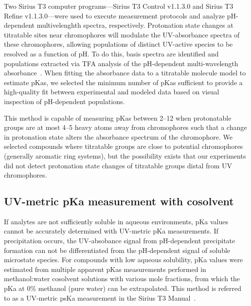 \documentclass[9pt,lineno]{elife}
\begin{document}
Two Sirius T3 computer programs---Sirius T3 Control v1.1.3.0 and Sirius T3 Refine v1.1.3.0---were used to execute measurement protocols and analyze pH-dependent multivelenghth spectra, respectively.
Protonation state changes at titratable sites near chromophores will modulate the UV-absorbance spectra of these chromophores, allowing populations of distinct UV-active species to be resolved as a function of pH. 
To do this, basis spectra are identified and populations extracted via TFA analysis of the pH-dependent multi-wavelength absorbance~\citep{allen_multiwavelength_1998}. 
When fitting the absorbance data to a titratable molecule model to estimate pKas, we selected the minimum number of pKas sufficient to provide a high-quality fit between experimental and modeled data based on visual inspection of pH-dependent populations.

This method is capable of measuring pKas between 2--12 when protonatable groups are at most 4--5 heavy atoms away from chromophores such that a change in protonation state alters the absorbance spectrum of the chromophore. 
We selected compounds where titratable groups are close to potential chromophores (generally aromatic ring systems), but the possibility exists that our experiments did not detect protonation state changes of titratable groups distal from UV chromophores.

\subsection{UV-metric pKa measurement with cosolvent}

If analytes are not sufficiently soluble in aqueous environments, pKa values cannot be accurately determined with UV-metric pKa measurements. 
If precipitation occurs, the UV-absobance signal from pH-dependent precipitate formation can not be differentiated from the pH-dependent signal of soluble microstate species. 
For compounds with low aqueous solubility, pKa values were estimated from multiple apparent pKas measurements performed in methanol:water cosolvent solutions with various mole fractions, from which the pKa at 0\% methanol (pure water) can be extrapolated. 
This method is referred to as a UV-metric psKa measurement in the Sirius T3 Manual~\citep{noauthor_sirius_2008}.
\end{document}
